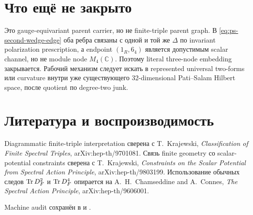 \section{Что ещё не закрыто}

Это gauge-equivariant parent carrier, но не finite-triple parent graph. В
\eqref{eq:ps-second-wedge-edge} оба ребра связаны с одной и той же
\(\Delta\) по invariant polarization prescription, а endpoint
\((1_R,6_4)\) является допустимым scalar channel, но не module node
\(M_4(\mathbb C)\). Поэтому literal three-node embedding закрывается.
Рабочий механизм следует искать в represented universal two-forms или
curvature внутри уже существующего 32-dimensional Pati--Salam Hilbert space,
после quotient по degree-two junk.

\section{Литература и воспроизводимость}

Diagrammatic finite-triple interpretation сверена с T.~Krajewski,
\emph{Classification of Finite Spectral Triples}, arXiv:hep-th/9701081.
Связь finite geometry со scalar-potential constraints сверена с
T.~Krajewski, \emph{Constraints on the Scalar Potential from Spectral Action
Principle}, arXiv:hep-th/9803199. Использование обычных следов
\(\operatorname{Tr} D_F^2\) и \(\operatorname{Tr} D_F^4\) опирается на A.~H.~Chamseddine and A.~Connes,
\emph{The Spectral Action Principle}, arXiv:hep-th/9606001.

Machine audit сохранён в
 и
.